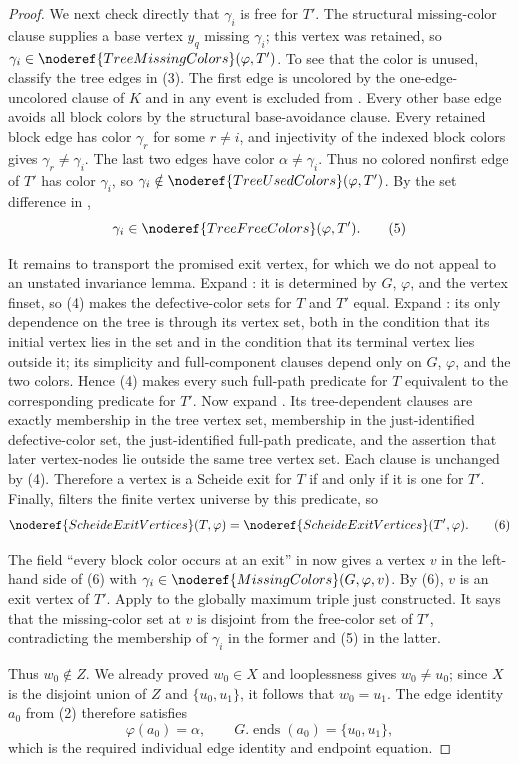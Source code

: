 \begin{proof}
We next check directly that $\gamma_i$ is free for $T'$.  The structural
missing-color clause supplies a base vertex $y_q$ missing $\gamma_i$;
this vertex was retained, so
$\gamma_i\in\noderef{TreeMissingColors}(\varphi,T')$.  To see that the
color is unused, classify the tree edges in (3).  The first edge is
uncolored by the one-edge-uncolored clause of $K$ and in any event is
excluded from .  Every other base edge avoids
all block colors by the structural base-avoidance clause.  Every retained
block edge has color $\gamma_r$ for some $r\ne i$, and injectivity of the
indexed block colors gives $\gamma_r\ne\gamma_i$.  The last two edges
have color $\alpha\ne\gamma_i$.  Thus no colored nonfirst edge of $T'$
has color $\gamma_i$, so
$\gamma_i\notin\noderef{TreeUsedColors}(\varphi,T')$.  By the set
difference in ,
\[
 \gamma_i\in\noderef{TreeFreeColors}(\varphi,T').             \tag{5}
\]

It remains to transport the promised exit vertex, for which we do not
appeal to an unstated invariance lemma.  Expand
: it is determined by $G$, $\varphi$, and the
vertex finset, so (4) makes the defective-color sets for $T$ and $T'$
equal.  Expand : its only dependence
on the tree is through its vertex set, both in the condition that its
initial vertex lies in the set and in the condition that its terminal
vertex lies outside it; its simplicity and full-component clauses depend
only on $G$, $\varphi$, and the two colors.  Hence (4) makes every such
full-path predicate for $T$ equivalent to the corresponding predicate
for $T'$.  Now expand .  Its tree-dependent
clauses are exactly membership in the tree vertex set, membership in the
just-identified defective-color set, the just-identified full-path
predicate, and the assertion that later vertex-nodes lie outside the same
tree vertex set.  Each clause is unchanged by (4).  Therefore a vertex is
a Scheide exit for $T$ if and only if it is one for $T'$.  Finally,
 filters the finite vertex universe by this
predicate, so
\[
 \noderef{ScheideExitVertices}(T,\varphi)
   =\noderef{ScheideExitVertices}(T',\varphi).                 \tag{6}
\]

The field ``every block color occurs at an exit'' in
 now gives a vertex $v$ in the
left-hand side of (6) with
$\gamma_i\in\noderef{MissingColors}(G,\varphi,v)$.  By (6), $v$ is an
exit vertex of $T'$.  Apply  to the globally
maximum triple just constructed.  It says that the missing-color set at
$v$ is disjoint from the free-color set of $T'$, contradicting the
membership of $\gamma_i$ in the former and (5) in the latter.

Thus $w_0\notin Z$.  We already proved $w_0\in X$ and looplessness gives
$w_0\ne u_0$; since $X$ is the disjoint union of $Z$ and
$\{u_0,u_1\}$, it follows that $w_0=u_1$.  The edge identity $a_0$ from
(2) therefore satisfies
\[
 \varphi(a_0)=\alpha,\qquad
 G.\operatorname{ends}(a_0)=\{u_0,u_1\},
\]
which is the required individual edge identity and endpoint equation.
\end{proof}
